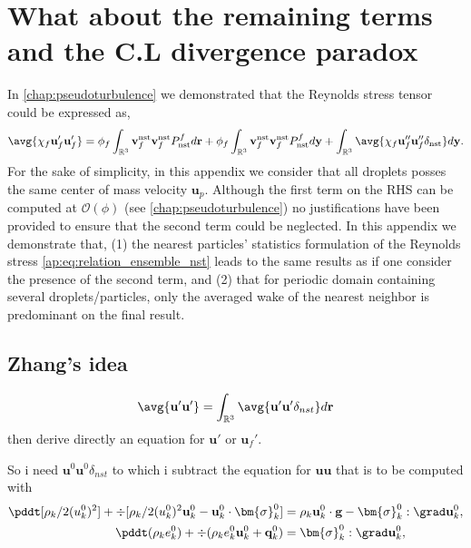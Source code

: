 \section{What about the remaining terms and the C.L divergence paradox }

In \ref{chap:pseudoturbulence} we demonstrated that the Reynolds stress tensor could be expressed as,
\begin{equation}
    \avg{\chi_f \textbf{u}_f'\textbf{u}_f'}
    = 
    \phi_f
    \int_{\mathbb{R}^3}
    \textbf{v}_f^\text{nst}
    \textbf{v}_f^\text{nst}
    P_\text{nst}^f
    d\textbf{r}
    + 
    \phi_f
    \int_{\mathbb{R}^3}
    \textbf{v}_f^\text{nst}
    \textbf{v}_f^\text{nst}
    P_\text{nst}^f
    d\textbf{y}
    + 
    \int_{\mathbb{R}^3}
    \avg{
        \chi_f
        \textbf{u}_f''
        \textbf{u}_f''
        \delta_\text{nst}
    }
    d\textbf{y}.
    \label{ap:eq:relation_ensemble_nst}
\end{equation}
For the sake of simplicity, in this appendix we consider that all droplets posses the same center of mass velocity $\textbf{u}_p$. 
Although the first term on the RHS can be computed at $\mathcal{O}(\phi)$ (see \ref{chap:pseudoturbulence}) no justifications have been provided to ensure that the second term could be neglected. 
In this appendix we demonstrate that, (1) the nearest particles' statistics formulation of the Reynolds stress \eqref{ap:eq:relation_ensemble_nst} leads to the same results as \citet{caflisch1985variance} if one consider the presence of the second term, and (2) that for periodic domain containing several droplets/particles, only the averaged wake of the nearest neighbor is predominant on the final result. 


\subsection{Zhang's idea}

\begin{equation}
    \avg{\textbf{u}'\textbf{u}'}
    =
    \int_{\mathbb{R}^3}\avg{\textbf{u}'\textbf{u}'\delta_{nst}} d\textbf{r}
\end{equation}
then derive directly an equation for $\textbf{u}'$ or $\textbf{u}_f'$. 

So i need $\textbf{u}^0\textbf{u}^0\delta_{nst}$ to which i subtract the equation for $\textbf{u} \textbf{u}$
that is to be computed with 
\begin{align}
    \label{eq:dt_rhou_k2}
    \pddt [\rho_k/2(u_k^0)^2]  
    + \div [\rho_k/2(u_k^0)^2\textbf{u}_k^0 - \textbf{u}_k^0 \cdot \bm{\sigma}_k^0]
    &=
    \rho_k\textbf{u}_k^0 \cdot \textbf{g}  
    -  \bm{\sigma}_k^0 : \grad \textbf{u}_k^0,
    \\
    \label{eq:dt_rhoe_k}
    \pddt (\rho_ke_k^0)  
    + \div (
        \rho_ke_k^0\textbf{u}_k^0
        + \textbf{q}_k^0
        )
    &= 
    \bm{\sigma}_k^0 : \grad \textbf{u}_k^0,
\end{align} 



